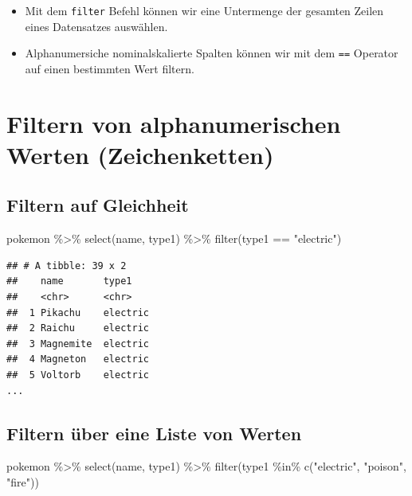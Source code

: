 \documentclass[
]{book}
\newenvironment{Shaded}{\begin{snugshade}}{\end{snugshade}}
\newcommand{\FunctionTok}[1]{\textcolor[rgb]{0.00,0.00,0.00}{#1}}
\newcommand{\NormalTok}[1]{#1}
\newcommand{\SpecialCharTok}[1]{\textcolor[rgb]{0.00,0.00,0.00}{#1}}
\newcommand{\StringTok}[1]{\textcolor[rgb]{0.31,0.60,0.02}{#1}}
\providecommand{\tightlist}{%
  \setlength{\itemsep}{0pt}\setlength{\parskip}{0pt}}
\begin{document}
\begin{itemize}
\tightlist
\item
  Mit dem \texttt{filter} Befehl können wir eine Untermenge der gesamten Zeilen eines Datensatzes auswählen.
\item
  Alphanumersiche nominalskalierte Spalten können wir mit dem \texttt{==} Operator auf einen bestimmten Wert filtern.
\end{itemize}

\hypertarget{filtern-von-alphanumerischen-werten-zeichenketten}{%
\section{Filtern von alphanumerischen Werten (Zeichenketten)}\label{filtern-von-alphanumerischen-werten-zeichenketten}}

\hypertarget{filtern-auf-gleichheit}{%
\subsection{Filtern auf Gleichheit}\label{filtern-auf-gleichheit}}

\begin{Shaded}
\begin{Highlighting}[]
\NormalTok{pokemon }\SpecialCharTok{\%\textgreater{}\%}
  \FunctionTok{select}\NormalTok{(name, type1) }\SpecialCharTok{\%\textgreater{}\%}
  \FunctionTok{filter}\NormalTok{(type1 }\SpecialCharTok{==} \StringTok{"electric"}\NormalTok{)}
\end{Highlighting}
\end{Shaded}

\begin{verbatim}
## # A tibble: 39 x 2
##    name       type1   
##    <chr>      <chr>   
##  1 Pikachu    electric
##  2 Raichu     electric
##  3 Magnemite  electric
##  4 Magneton   electric
##  5 Voltorb    electric
...
\end{verbatim}

\hypertarget{filtern-uxfcber-eine-liste-von-werten}{%
\subsection{Filtern über eine Liste von Werten}\label{filtern-uxfcber-eine-liste-von-werten}}

\begin{Shaded}
\begin{Highlighting}[]
\NormalTok{pokemon }\SpecialCharTok{\%\textgreater{}\%}
  \FunctionTok{select}\NormalTok{(name, type1) }\SpecialCharTok{\%\textgreater{}\%}
  \FunctionTok{filter}\NormalTok{(type1 }\SpecialCharTok{\%in\%} \FunctionTok{c}\NormalTok{(}\StringTok{"electric"}\NormalTok{, }\StringTok{"poison"}\NormalTok{, }\StringTok{"fire"}\NormalTok{))}
\end{Highlighting}
\end{Shaded}
\end{document}
